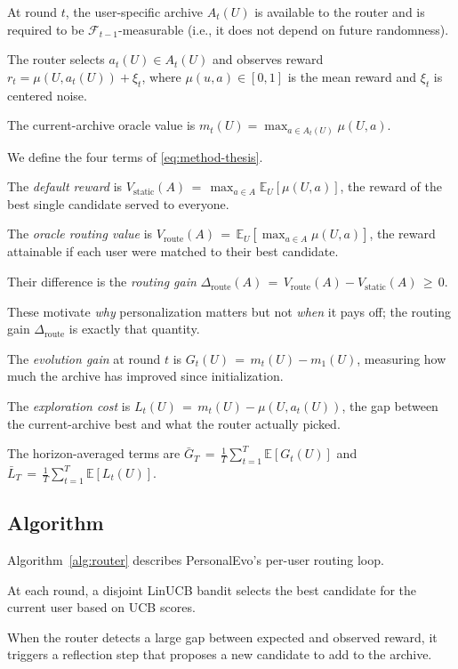 \documentclass{article} %
\providecommand{\E}{\mathbb{E}}
\begin{document}
At round $t$, the user-specific archive $A_t(U)$ is available to the router and is required to be $\mathcal{F}_{t-1}$-measurable (i.e., it does not depend on future randomness).

The router selects $a_t(U) \in A_t(U)$ and observes reward $r_t = \mu(U, a_t(U)) + \xi_t$, where $\mu(u,a) \in [0,1]$ is the mean reward and $\xi_t$ is centered noise.

The current-archive oracle value is $m_t(U) = \max_{a \in A_t(U)} \mu(U,a)$.

We define the four terms of \eqref{eq:method-thesis}.

The \emph{default reward} is $V_{\mathrm{static}}(A) \,=\, \max_{a \in A} \E_{U}[\mu(U,a)]$, the reward of the best single candidate served to everyone.

The \emph{oracle routing value} is $V_{\mathrm{route}}(A) \,=\, \E_{U}[\max_{a \in A} \mu(U,a)]$, the reward attainable if each user were matched to their best candidate.

Their difference is the \emph{routing gain} $\Delta_{\mathrm{route}}(A) \,=\, V_{\mathrm{route}}(A) - V_{\mathrm{static}}(A) \,\geq\, 0$.

These motivate \emph{why} personalization matters but not \emph{when} it pays off; the routing gain $\Delta_{\mathrm{route}}$ is exactly that quantity.

The \emph{evolution gain} at round $t$ is $G_t(U) \,=\, m_t(U) - m_1(U)$, measuring how much the archive has improved since initialization.

The \emph{exploration cost} is $L_t(U) \,=\, m_t(U) - \mu(U, a_t(U))$, the gap between the current-archive best and what the router actually picked.

The horizon-averaged terms are $\bar G_T \,=\, \frac{1}{T}\sum_{t=1}^T \E[G_t(U)]$ and $\bar L_T \,=\, \frac{1}{T}\sum_{t=1}^T \E[L_t(U)]$.

\subsection{Algorithm}

\label{sec:method-alg}

Algorithm~\ref{alg:router} describes PersonalEvo's per-user routing loop.

At each round, a disjoint LinUCB bandit selects the best candidate for the current user based on UCB scores.

When the router detects a large gap between expected and observed reward, it triggers a reflection step that proposes a new candidate to add to the archive.
\end{document}
